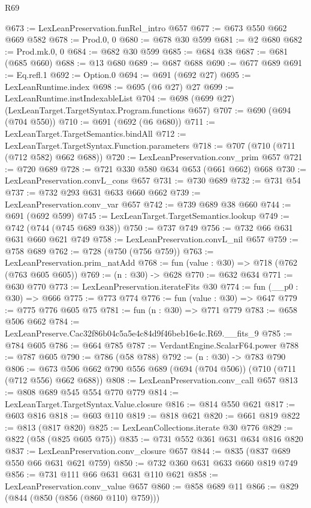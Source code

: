 \begin{lexlean}{R69}
\begin{coremodule}
@673 := LexLeanPreservation.funRel_intro @657
@677 := @673 @550 @662 @669 @582
@678 := Prod.{0, 0}
@680 := @678 @30 @599
@681 := @2 @680
@682 := Prod.mk.{0, 0}
@684 := @682 @30 @599
@685 := @684 @38
@687 := @681 (@685 @660)
@688 := @13 @680
@689 := @687 @688
@690 := @677 @689
@691 := Eq.refl.{1}
@692 := Option.{0}
@694 := @691 (@692 @27)
@695 := LexLeanRuntime.index
@698 := @695 (@6 @27) @27
@699 := LexLeanRuntime.instIndexableList
@704 := @698 (@699 @27) (LexLeanTarget.TargetSyntax.Program.functions @657)
@707 := @690 (@694 (@704 @550))
@710 := @691 (@692 (@6 @680))
@711 := LexLeanTarget.TargetSemantics.bindAll
@712 := LexLeanTarget.TargetSyntax.Function.parameters
@718 := @707 (@710 (@711 (@712 @582) @662 @688))
@720 := LexLeanPreservation.conv_prim @657
@721 := @720 @689
@728 := @721 @330 @580 @634 @653 (@661 @662) @668
@730 := LexLeanPreservation.convL_cons @657
@731 := @730 @689
@732 := @731 @54
@737 := @732 @293 @631 @633 @660 @662
@739 := LexLeanPreservation.conv_var @657
@742 := @739 @689 @38 @660
@744 := @691 (@692 @599)
@745 := LexLeanTarget.TargetSemantics.lookup
@749 := @742 (@744 (@745 @689 @38))
@750 := @737 @749
@756 := @732 @66 @631 @631 @660 @621 @749
@758 := LexLeanPreservation.convL_nil @657
@759 := @758 @689
@762 := @728 (@750 (@756 @759))
@763 := LexLeanPreservation.prim_natAdd
@768 := fun (value : @30) => @718 (@762 (@763 @605 @605))
@769 := (n : @30) -> @628
@770 := @632 @634
@771 := @630 @770
@773 := LexLeanPreservation.iterateFits @30
@774 := fun (__p0 : @30) => @666
@775 := @773 @774
@776 := fun (value : @30) => @647
@779 := @775 @776 @605 @75
@781 := fun (n : @30) => @771 @779
@783 := @658 @506 @662
@784 := LexLeanPreserve.Cac32f86b04c5a5e4c84d9f46beb16e4c.R69.__fits_9
@785 := @784 @605
@786 := @664 @785
@787 := VerdantEngine.ScalarF64.power
@788 := @787 @605
@790 := @786 (@58 @788)
@792 := (n : @30) -> @783 @790
@806 := @673 @506 @662 @790 @556 @689 (@694 (@704 @506)) (@710 (@711 (@712 @556) @662 @688))
@808 := LexLeanPreservation.conv_call @657
@813 := @808 @689 @545 @554 @770 @779
@814 := LexLeanTarget.TargetSyntax.Value.closure
@816 := @814 @550 @621
@817 := @603 @816
@818 := @603 @110
@819 := @818 @621
@820 := @661 @819
@822 := @813 (@817 @820)
@825 := LexLeanCollections.iterate @30 @776
@829 := @822 (@58 (@825 @605 @75))
@835 := @731 @552 @361 @631 @634 @816 @820
@837 := LexLeanPreservation.conv_closure @657
@844 := @835 (@837 @689 @550 @66 @631 @621 @759)
@850 := @732 @360 @631 @633 @660 @819 @749
@856 := @731 @111 @66 @631 @631 @110 @621
@858 := LexLeanPreservation.conv_value @657
@860 := @858 @689 @11
@866 := @829 (@844 (@850 (@856 (@860 @110) @759)))

\end{coremodule}
\end{lexlean}
